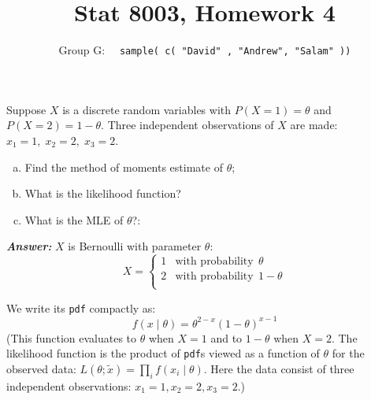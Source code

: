 \documentclass[12pt]{article}
\newenvironment{question}[2][Question]{\begin{trivlist}
\item[\hskip \labelsep {\bfseries #1}\hskip \labelsep {\bfseries #2.}]}{\end{trivlist}}
\begin{document}
 \renewcommand{\arraystretch}{1.3}

 
\title{Stat 8003, Homework 4}%
\author{Group G: \ \ \texttt{sample( c( "David" , "Andrew",  "Salam" ))}
\\ %
} %
 
\maketitle
 
 \begin{question}{4.1} Suppose $X$ is a discrete random variables with $P(X = 1) = \theta$   and $ P(X = 2) = 1 − \theta$. Three independent observations of $X$ are made: $x_1 = 1,\; x_2 = 2,\;  x_3 = 2$.
 \begin{enumerate}[(a)]
\item Find the method of moments estimate of $\theta$;
\item What is the likelihood function?
\item What is the MLE of $\theta$?:
\end{enumerate}
\end{question} 


  \textbf{\color{TealBlue}\emph{Answer:} } 
 $X$ is Bernoulli with parameter $\theta$:
  \[ 
X = 
  \begin{cases} 
       1    &  \text{with probability} \ \   \theta \\
       2  &  \text{with probability}  \ \ 1 - \theta \\
   \end{cases}
\]

We write its \texttt{pdf} compactly as:
$$
f(x \mid \theta) = \theta^{2 - x} (1 - \theta)^{x -1}
$$
(This function evaluates to $\theta $ when $X = 1$ and to $1 - \theta$ when $X = 2$. The likelihood function is the product of \texttt{pdf}s viewed as a function of $\theta$ for the observed data: $L(\theta; \tilde x) = \prod_i f(x_i \mid \theta) $. Here the data consist of three independent observations: $x_1 = 1, x_2 = 2, x_3 = 2$.)
\end{document}

